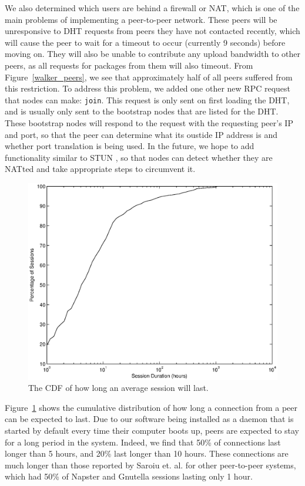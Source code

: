 \documentclass[conference]{IEEEtran}
\begin{document}
We also determined which users are
behind a firewall or NAT, which is one of the main problems of
implementing a peer-to-peer network. These peers will be
unresponsive to DHT requests from peers they have not contacted
recently, which will cause the peer to wait for a timeout to occur
(currently 9 seconds) before moving on. They will also be
unable to contribute any upload bandwidth to other peers, as all
requests for packages from them will also timeout. From
Figure~\ref{walker_peers}, we see that approximately half of all
peers suffered from this restriction. To address this problem, we added one other new RPC request that nodes can make:
\texttt{join}. This request is only sent on first loading the DHT,
and is usually only sent to the bootstrap nodes that are listed for
the DHT. These bootstrap nodes will respond to the request with the
requesting peer's IP and port, so that the peer can determine what
its oustide IP address is and whether port translation is being
used. In the future, we hope to add functionality similar to STUN
\cite{STUN}, so that nodes can detect whether they are NATted and
take appropriate steps to circumvent it.


\begin{figure}
\centering
\includegraphics[width=0.80\columnwidth]{AptP2PDuration-peers.eps}
\caption{The CDF of how long an average session will last.}
\label{duration_peers}
\end{figure}

Figure~\ref{duration_peers} shows the cumulative distribution of how
long a connection from a peer can be expected to last. Due to our
software being installed as a daemon that is started by default
every time their computer boots up, peers are expected to stay for a
long period in the system.
Indeed, we find that 50\% of connections last longer than 5
hours, and 20\% last longer than 10 hours. These connections are
much longer than those reported by Saroiu et. al. \cite{saroiu2001}
for other peer-to-peer systems, which had 50\% of Napster and Gnutella
sessions lasting only 1 hour.
\end{document}
